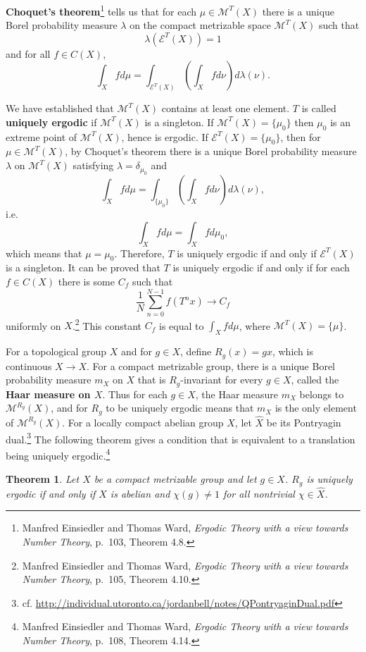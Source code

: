\documentclass{article}
\newtheorem{theorem}{Theorem}
\theoremstyle{definition}
\begin{document}
\textbf{Choquet's theorem}\footnote{Manfred Einsiedler and Thomas Ward, {\em Ergodic Theory with a view towards Number Theory},
p.~103, Theorem 4.8.} tells us that for each $\mu \in \mathscr{M}^T(X)$ there is a unique 
Borel probability measure $\lambda$ on the compact metrizable space $\mathscr{M}^T(X)$ such that
\[
\lambda(\mathscr{E}^T(X))=1
\]
and for all $f \in C(X)$,
\[
\int_X f d\mu = \int_{\mathscr{E}^T(X)} \left( \int_X f d\nu \right) d\lambda(\nu).
\]

We have established that $\mathscr{M}^T(X)$ contains at least one element.
$T$ is called \textbf{uniquely ergodic} if $\mathscr{M}^T(X)$ is a singleton. 
If $\mathscr{M}^T(X)=\{\mu_0\}$ then $\mu_0$ is an extreme point of
$\mathscr{M}^T(X)$, hence is ergodic. If $\mathscr{E}^T(X)=\{\mu_0\}$, then for 
$\mu \in \mathscr{M}^T(X)$, by Choquet's theorem there is a unique Borel probability
measure $\lambda$ on $\mathscr{M}^T(X)$ satisfying
$\lambda = \delta_{\mu_0}$ and
\[
\int_X f d\mu = \int_{\{\mu_0\}} \left( \int_X f d\nu\right) d\lambda(\nu),
\]
i.e.
\[
\int_X fd\mu = \int_X f d\mu_0,
\]
which means that $\mu = \mu_0$. Therefore, $T$ is uniquely ergodic if and only if $\mathscr{E}^T(X)$
is a singleton.
It can be proved that $T$ is uniquely ergodic if and only if for each
$f \in C(X)$ there is some $C_f$ such that
\[
\frac{1}{N} \sum_{n=0}^{N-1} f(T^n x) \to C_f
\]
uniformly on $X$.\footnote{Manfred Einsiedler and Thomas Ward, {\em Ergodic Theory with a view towards Number Theory},
p.~105, Theorem 4.10.}
This constant $C_f$ is equal to $\int_X f d\mu$, where $\mathscr{M}^T(X)=\{\mu\}$.

For a topological group $X$ and for $g \in X$, define $R_g(x) = gx$, which is continuous
$X \to X$. 
For a compact metrizable group, there is a unique Borel probability measure
$m_X$ on $X$ that is $R_g$-invariant for every $g \in X$, called the \textbf{Haar measure on $X$}.
Thus for each $g \in X$, the Haar measure $m_X$ belongs to $\mathscr{M}^{R_g}(X)$, and for
$R_g$ to be uniquely ergodic means that $m_X$ is the only element of $\mathscr{M}^{R_g}(X)$.
For a locally compact abelian group $X$, let $\widehat{X}$ be its Pontryagin dual.\footnote{cf.
\url{http://individual.utoronto.ca/jordanbell/notes/QPontryaginDual.pdf}} 
The following theorem gives a condition that is equivalent to a translation being uniquely ergodic.\footnote{Manfred Einsiedler and Thomas Ward, {\em Ergodic Theory with a view towards Number Theory},
p.~108, Theorem 4.14.}


\begin{theorem}
Let $X$ be a compact metrizable group and let $g \in X$. $R_g$ is uniquely
ergodic if and only if $X$ is abelian and $\chi(g) \neq 1$ for all nontrivial $\chi \in \widehat{X}$.
\end{theorem}
\end{document}
